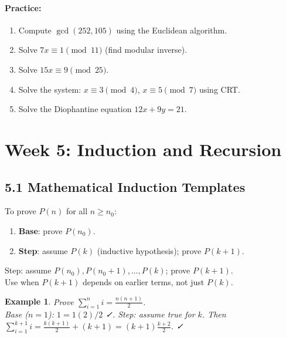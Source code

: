 \documentclass[11pt]{article}
\newtheorem{example}[definition]{Example}
\newenvironment{practice}{\paragraph*{\textbf{Practice:}}}{}
\begin{document}
\begin{practice}
\begin{enumerate}[nosep,label=\arabic*.]
  \item Compute $\gcd(252,105)$ using the Euclidean algorithm.
  \item Solve $7x\equiv1\pmod{11}$ (find modular inverse).
  \item Solve $15x\equiv9\pmod{25}$.
  \item Solve the system: $x\equiv3\pmod4$, $x\equiv5\pmod7$ using CRT.
  \item Solve the Diophantine equation $12x+9y=21$.
\end{enumerate}
\end{practice}

\newpage
\section{Week 5: Induction and Recursion}
\setcounter{definition}{0}

\subsection*{5.1 Mathematical Induction Templates}

\begin{tcolorbox}[keybox={Ordinary induction}]
To prove $P(n)$ for all $n\ge n_0$:
\begin{enumerate}[nosep,label=\arabic*.]
  \item \textbf{Base}: prove $P(n_0)$.
  \item \textbf{Step}: assume $P(k)$ (inductive hypothesis); prove $P(k+1)$.
\end{enumerate}
\end{tcolorbox}

\begin{tcolorbox}[keybox={Strong induction}]
Step: assume $P(n_0),P(n_0+1),\ldots,P(k)$; prove $P(k+1)$.\\
Use when $P(k+1)$ depends on earlier terms, not just $P(k)$.
\end{tcolorbox}

\begin{example}
Prove $\displaystyle\sum_{i=1}^n i=\frac{n(n+1)}{2}$.\\
Base ($n=1$): $1=1(2)/2$ ✓. Step: assume true for $k$. Then
$\sum_{i=1}^{k+1}i=\frac{k(k+1)}{2}+(k+1)=(k+1)\frac{k+2}{2}$. ✓
\end{example}
\end{document}
